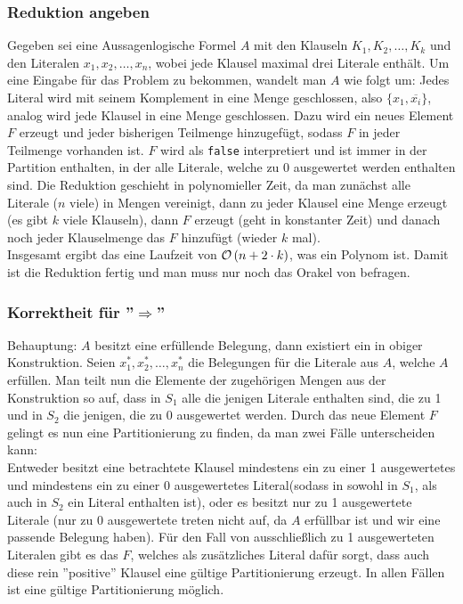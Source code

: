 \documentclass[a4paper]{article}
\begin{document}
			\subsubsection{Reduktion angeben}
			Gegeben sei eine Aussagenlogische Formel $A$ mit den Klauseln $K_1, K_2, \dots, K_k$ und den Literalen $x_1, x_2, \dots, x_n$, wobei jede Klausel maximal drei Literale enthält.
			Um eine Eingabe für das \setsplit Problem zu bekommen, wandelt man $A$ wie folgt um:\n
			Jedes Literal wird mit seinem Komplement in eine Menge geschlossen, also $\{x_1, \overline{x_i}\}$, analog wird jede Klausel in eine Menge geschlossen.
			Dazu wird ein neues Element $F$ erzeugt und jeder bisherigen Teilmenge hinzugefügt, sodass $F$ in jeder Teilmenge vorhanden ist. $F$ wird als \texttt{false} interpretiert und ist immer in der Partition enthalten, in der alle Literale, welche zu 0 ausgewertet werden enthalten sind.\n
			Die Reduktion geschieht in polynomieller Zeit, da man zunächst alle Literale ($n$ viele) in Mengen vereinigt, dann zu jeder Klausel eine Menge erzeugt (es gibt $k$ viele Klauseln), dann $F$ erzeugt (geht in konstanter Zeit) und danach noch jeder Klauselmenge das $F$ hinzufügt (wieder $k$ mal).\\
			Insgesamt ergibt das eine Laufzeit von $\mathcal{O}\left(n+2\cdot k\right)$, was ein Polynom ist.\n
			Damit ist die Reduktion fertig und man muss nur noch das Orakel von \setsplit befragen.
			\subsubsection{Korrektheit für ''$\Rightarrow$''}
			Behauptung: $A$ besitzt eine erfüllende Belegung, dann existiert ein \setsplit in obiger Konstruktion.\n
			Seien $x_1^*, x_2^*, \dots, x_n^*$ die Belegungen für die Literale aus $A$, welche $A$ erfüllen.
			Man teilt nun die Elemente der zugehörigen Mengen aus der Konstruktion so auf, dass in $S_1$ alle die jenigen Literale enthalten sind, die zu 1 und in $S_2$ die jenigen, die zu 0 ausgewertet werden.
			Durch das neue Element $F$ gelingt es nun eine Partitionierung zu finden, da man zwei Fälle unterscheiden kann:\\
			Entweder besitzt eine betrachtete Klausel mindestens ein zu einer 1 ausgewertetes und mindestens ein zu einer 0 ausgewertetes Literal(sodass in sowohl in $S_1$, als auch in $S_2$ ein Literal enthalten ist), oder es besitzt nur zu 1 ausgewertete Literale (nur zu 0 ausgewertete treten nicht auf, da $A$ erfüllbar ist und wir eine passende Belegung haben).
			Für den Fall von ausschließlich zu 1 ausgewerteten Literalen gibt es das $F$, welches als zusätzliches Literal dafür sorgt, dass auch diese rein ''positive'' Klausel eine gültige Partitionierung erzeugt.\n
			In allen Fällen ist eine gültige Partitionierung möglich.
\end{document}
